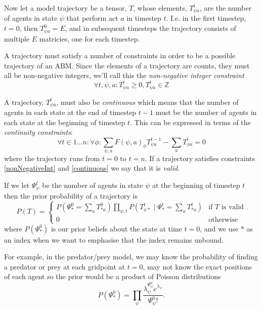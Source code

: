 Now let a model trajectory be a tensor, $T$, whose elements, $T^t_{\psi a}$, are the number of agents in state $\psi$ that perform act $a$ in timestep $t$. I.e. in the first timestep, $t=0$, then $T^0_{\psi a} = E$, and in subsequent timesteps the trajectory consists of multiple $E$ matricies, one for each timestep.

A trajectory must satisfy a number of constraints in order to be a possible trajectory of an ABM. Since the elements of a trajectory are counts, they must all be non-negative integers, we'll call this the \textit{non-negative integer constraint}
\begin{equation}
\forall t,\psi, a: T^t_{\psi a} \ge 0, T^t_{\psi a} \in \mathbb{Z}
\label{nonNegativeInt}
\end{equation}

A trajectory, $T^t_{\psi a}$, must also be \textit{continuous} which means that the number of agents in each state at the end of timestep $t-1$ must be the number of agents in each state at the beginning of timestep $t$. This can be expressed in terms of the \textit{continuity constraints}:
\begin{equation}
\forall t \in 1 ... n:\forall \phi: \sum_{\psi, a} F(\psi, a)_\phi T^{t-1}_{\psi a} - \sum_a T^t_{\phi a} = 0
\label{continuous}
\end{equation}
where the trajectory runs from $t=0$ to $t=n$. If a trajectory satisfies constraints \ref{nonNegativeInt} and \ref{continuous} we say that it is \textit{valid}.

If we let $\Psi^t_\psi$ be the number of agents in state $\psi$ at the beginning of timestep $t$ then the prior probability of a trajectory is
\[
P(T) =
\begin{cases}
P\left(\Psi^0_{*} = \sum_a T^0_{* a}\right) \prod_{\psi, t} P\left(T^t_{\psi *} \mid \Psi^t_* = \sum_a T^t_{* a}\right) & \text{if } T \text{ is valid} \\
0 & \text{otherwise}
\end{cases}
\]
where $P(\Psi^0_*)$ is our prior beliefs about the state at time $t=0$, and we use $*$ as an index when we want to emphasise that the index remains unbound.

For example, in the predator/prey model, we may know the probability of finding a predator or prey at each gridpoint at $t=0$, may not know the exact positions of each agent so the prior would be a product of Poisson distributions
\[
P(\Psi^0_*) = \prod_\psi \frac{\lambda_\psi^{\Psi^0_\psi} e^{\lambda_\psi}}{\Psi^0_\psi!}.
\]

